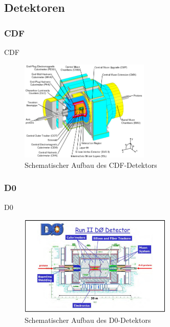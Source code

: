 \documentclass[aspectratio=1610, 9pt]{beamer}
\begin{document}
\subsection{Detektoren}

\subsubsection{CDF}

\begin{frame}{CDF}
    \begin{figure}
      \includegraphics[width=0.55\textwidth]{images/CDF.png}
      \caption{Schematischer Aufbau des CDF-Detektors \cite{CDF_aufbau}}
    \end{figure}
\end{frame}


\subsubsection{D0}

\begin{frame}{D0}
  \begin{figure}
    \includegraphics[width=0.65\textwidth]{images/d0.jpg}
    \caption{Schematischer Aufbau des D0-Detektors \cite{D0}}
  \end{figure}
\end{frame}
\end{document}

